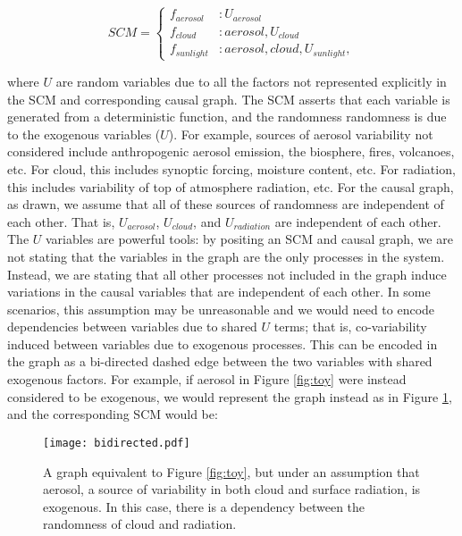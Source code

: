 \documentclass[12pt]{article}
\begin{document}
\begin{equation}
  SCM =
  \begin{cases}
    f_{aerosol} &: U_{aerosol} \\
    f_{cloud} &: aerosol, U_{cloud}  \\
    f_{sunlight} &: aerosol, cloud, U_{sunlight},
  \end{cases}
  \label{eq:1}
\end{equation}

where $U$ are random variables due to all the factors not represented
explicitly in the SCM and corresponding causal graph. The SCM asserts
that each variable is generated from a deterministic function, and the
randomness randomness is due to the exogenous variables ($U$). For
example, sources of aerosol variability not considered include
anthropogenic aerosol emission, the biosphere, fires, volcanoes,
etc. For cloud, this includes synoptic forcing, moisture content,
etc. For radiation, this includes variability of top of atmosphere
radiation, etc. For the causal graph, as drawn, we assume that all of
these sources of randomness are independent of each other. That is,
$U_{aerosol}$, $U_{cloud}$, and $U_{radiation}$ are independent of
each other. The $U$ variables are powerful tools: by positing an SCM
and causal graph, we are not stating that the variables in the graph
are the only processes in the system. Instead, we are stating that all
other processes not included in the graph induce variations in the
causal variables that are independent of each other. In some
scenarios, this assumption may be unreasonable and we would need to
encode dependencies between variables due to shared $U$ terms; that is,
co-variability induced between variables due to exogenous
processes. This can be encoded in the graph as a bi-directed dashed
edge between the two variables with shared exogenous factors. For
example, if aerosol in Figure \ref{fig:toy} were instead considered to
be exogenous, we would represent the graph instead as in Figure
\ref{fig:bi-directed}, and the corresponding SCM would be:

\begin{figure}
  \texttt{[image: bidirected.pdf]}
  \caption{A graph equivalent to Figure \ref{fig:toy}, but under an
    assumption that aerosol, a source of variability in both cloud and
    surface radiation, is exogenous. In this case, there is a dependency
    between the randomness of cloud and radiation.}
  \label{fig:bi-directed}
\end{figure}
\end{document}
